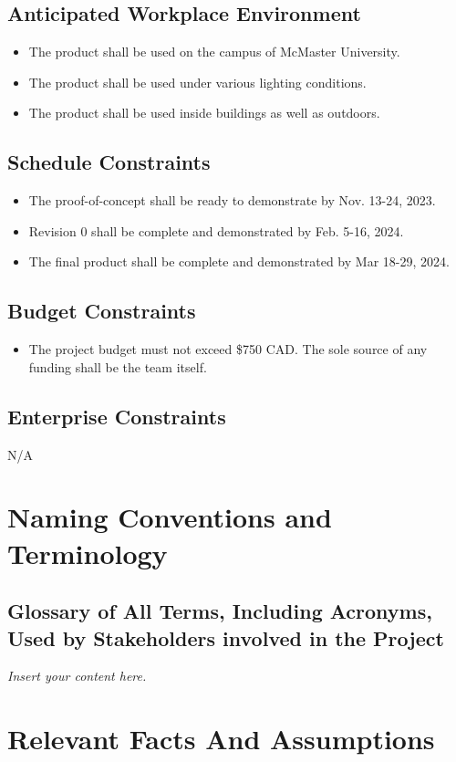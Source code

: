 \documentclass[12pt]{article}
\newcommand{\lips}{\textit{Insert your content here.}}
\begin{document}
\subsection{Anticipated Workplace Environment}
\begin{itemize}
  \item The product shall be used on the campus of McMaster University.
  \item The product shall be used under various lighting conditions.
  \item The product shall be used inside buildings as well as outdoors.
\end{itemize}
\subsection{Schedule Constraints}
\begin{itemize}
  \item The proof-of-concept shall be ready to demonstrate by Nov. 13-24, 2023.
  \item Revision 0 shall be complete and demonstrated by Feb. 5-16, 2024.
  \item The final product shall be complete and demonstrated by Mar 18-29, 2024.
\end{itemize}
\subsection{Budget Constraints}
\begin{itemize}
  \item The project budget must not exceed \$750 CAD. The sole source of any funding shall be the team itself. 
\end{itemize}
\subsection{Enterprise Constraints}
N/A
\section{Naming Conventions and Terminology}
\subsection{Glossary of All Terms, Including Acronyms, Used by Stakeholders
involved in the Project}
\lips

\section{Relevant Facts And Assumptions}
\end{document}
